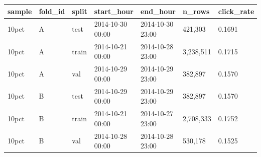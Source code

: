 \begin{tabular}{lllllll}
\toprule
sample & fold\_id & split & start\_hour & end\_hour & n\_rows & click\_rate \\
\midrule
10pct & A & test & 2014-10-30 00:00 & 2014-10-30 23:00 & 421,303 & 0.1691 \\
10pct & A & train & 2014-10-21 00:00 & 2014-10-28 23:00 & 3,238,511 & 0.1715 \\
10pct & A & val & 2014-10-29 00:00 & 2014-10-29 23:00 & 382,897 & 0.1570 \\
10pct & B & test & 2014-10-29 00:00 & 2014-10-29 23:00 & 382,897 & 0.1570 \\
10pct & B & train & 2014-10-21 00:00 & 2014-10-27 23:00 & 2,708,333 & 0.1752 \\
10pct & B & val & 2014-10-28 00:00 & 2014-10-28 23:00 & 530,178 & 0.1525 \\
\bottomrule
\end{tabular}
